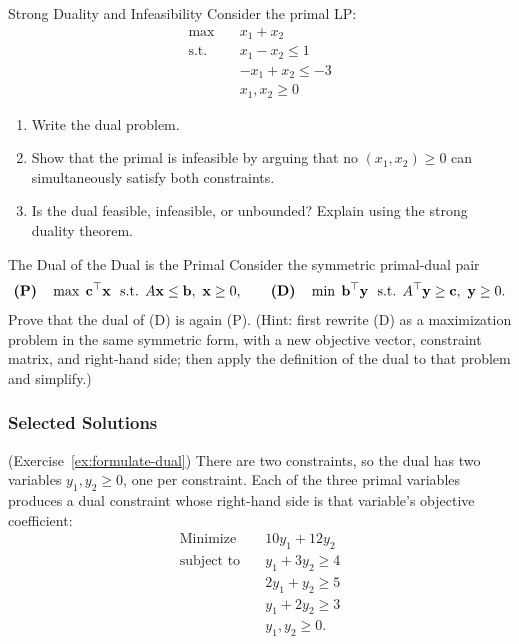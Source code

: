 \begin{ex}{Strong Duality and Infeasibility}{}
 Consider the primal LP:
\[
\begin{aligned}
\max \quad & x_1 + x_2 \\
\text{s.t.} \quad & x_1 - x_2 \leq 1 \\
& -x_1 + x_2 \leq -3 \\
& x_1, x_2 \geq 0
\end{aligned}
\]
\begin{enumerate}
\item Write the dual problem.
\item Show that the primal is infeasible by arguing that no $(x_1, x_2) \geq 0$ can simultaneously satisfy both constraints.
\item Is the dual feasible, infeasible, or unbounded? Explain using the strong duality theorem.
\end{enumerate}
\end{ex}


\begin{ex}{The Dual of the Dual is the Primal}{}
\label{ex:dual-of-dual}
 Consider the symmetric primal-dual pair
\[
\textbf{(P)} \quad \max \; \mathbf{c}^\top \mathbf{x} \ \text{ s.t. } A\mathbf{x} \leq \mathbf{b}, \ \mathbf{x} \geq 0,
\qquad
\textbf{(D)} \quad \min \; \mathbf{b}^\top \mathbf{y} \ \text{ s.t. } A^\top \mathbf{y} \geq \mathbf{c}, \ \mathbf{y} \geq 0.
\]
Prove that the dual of (D) is again (P).  (Hint: first rewrite (D) as a maximization problem in the same symmetric form, with a new objective vector, constraint matrix, and right-hand side; then apply the definition of the dual to that problem and simplify.)
\exrefs{\S\ref{sec:duality-strong}, \S\ref{sec:duality-forms}}
\end{ex}

\subsubsection*{Selected Solutions}

\begin{solution}(Exercise~\ref{ex:formulate-dual})
There are two constraints, so the dual has two variables $y_1, y_2 \geq 0$, one per constraint.  Each of the three primal variables produces a dual constraint whose right-hand side is that variable's objective coefficient:
\[
\begin{aligned}
\text{Minimize} \quad & 10y_1 + 12y_2 \\
\text{subject to} \quad
& y_1 + 3y_2 \geq 4 \\
& 2y_1 + y_2 \geq 5 \\
& y_1 + 2y_2 \geq 3 \\
& y_1, y_2 \geq 0.
\end{aligned}
\]
\end{solution}

